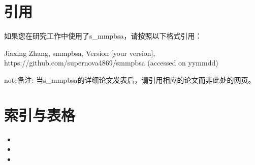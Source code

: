 \documentclass[letterpaper,10pt,english]{sphinxmanual}
\begin{document}
\chapter{引用}
\label{\detokenize{index:id6}}
\sphinxAtStartPar
如果您在研究工作中使用了s\_mmpbsa，请按照以下格式引用：

\begin{sphinxVerbatim}[commandchars=\\\{\}]
Jiaxing Zhang, s\PYGZus{}mmpbsa, Version [your version], https://github.com/supernova4869/s\PYGZus{}mmpbsa (accessed on yy\PYGZhy{}mm\PYGZhy{}dd)
\end{sphinxVerbatim}

\begin{sphinxadmonition}{note}{备注:}
\sphinxAtStartPar
当s\_mmpbsa的详细论文发表后，请引用相应的论文而非此处的网页。
\end{sphinxadmonition}


\chapter{索引与表格}
\label{\detokenize{index:id7}}\begin{itemize}
\item {} 
\sphinxAtStartPar
{}

\item {} 
\sphinxAtStartPar
{}

\item {} 
\sphinxAtStartPar
{}

\end{itemize}



\renewcommand{\indexname}{索引}
\printindex
\end{document}
